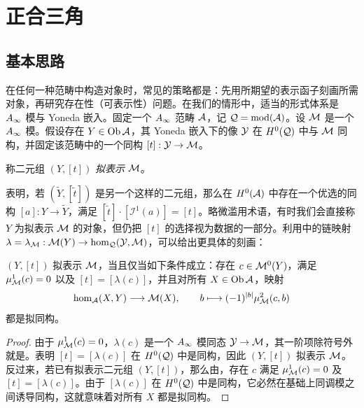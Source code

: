\section{正合三角}\label{sec:3}
\subsection{基本思路}\label{sec:3a}
在任何一种范畴中构造对象时，常见的策略都是：先用所期望的表示函子刻画所需对象，再研究存在性（可表示性）问题。在我们的情形中，适当的形式体系是 $A_\infty$ 模与 Yoneda 嵌入。固定一个 $A_\infty$ 范畴 $\mathcal A$，记 $\mathcal Q=\operatorname{mod}(\mathcal A)$。设 $\mathcal M$ 是一个 $A_\infty$ 模。假设存在 $Y\in\operatorname{Ob}\mathcal A$，其 Yoneda 嵌入下的像 $\mathcal Y$ 在 $H^0(\mathcal Q)$ 中与 $\mathcal M$ 同构，并固定该范畴中的一个同构 $[t]:\mathcal Y\to\mathcal M$。
\begin{definition*}
称二元组 $(Y,[t])$ \emph{拟表示} $\mathcal M$。
\end{definition*}
表明，若 $(\widetilde Y,[\tilde t])$ 是另一个这样的二元组，那么在 $H^0(\mathcal A)$ 中存在一个优选的同构 $[a]:Y\to\widetilde Y$，满足 $[\tilde t]\cdot[\mathcal I^1(a)]=[t]$。略微滥用术语，有时我们会直接称 $Y$ 为拟表示 $\mathcal M$ 的对象，但仍把 $[t]$ 的选择视为数据的一部分。利用中的链映射 $\lambda=\lambda_{\mathcal M}:\mathcal M(Y)\to\hom_{\mathcal Q}(\mathcal Y,\mathcal M)$，可以给出更具体的刻画：
\begin{lemma}\label{st:3.1}
$(Y,[t])$ 拟表示 $\mathcal M$，当且仅当如下条件成立：存在 $c\in\mathcal M^0(Y)$，满足 $\mu^1_{\mathcal M}(c)=0$ 以及 $[t]=[\lambda(c)]$，并且对所有 $X\in\operatorname{Ob}\mathcal A$，映射
\begin{equation}\label{eq:3.1}
\hom_{\mathcal A}(X,Y)\longrightarrow\mathcal M(X),\qquad b\longmapsto(-1)^{|b|}\mu^2_{\mathcal M}(c,b)
\end{equation}
都是拟同构。
\end{lemma}
\begin{proof}
由于 $\mu^1_{\mathcal M}(c)=0$，$\lambda(c)$ 是一个 $A_\infty$ 模同态 $\mathcal Y\to\mathcal M$，其一阶项除符号外就是。表明 $[t]=[\lambda(c)]$ 在 $H^0(\mathcal Q)$ 中是同构，因此 $(Y,[t])$ 拟表示 $\mathcal M$。反过来，若已有拟表示二元组 $(Y,[t])$，那么由，存在 $c$ 满足 $\mu^1_{\mathcal M}(c)=0$ 及 $[t]=[\lambda(c)]$。由于 $[\lambda(c)]$ 在 $H^0(\mathcal Q)$ 中是同构，它必然在基础上同调模之间诱导同构，这就意味着对所有 $X$ 都是拟同构。
\end{proof}


